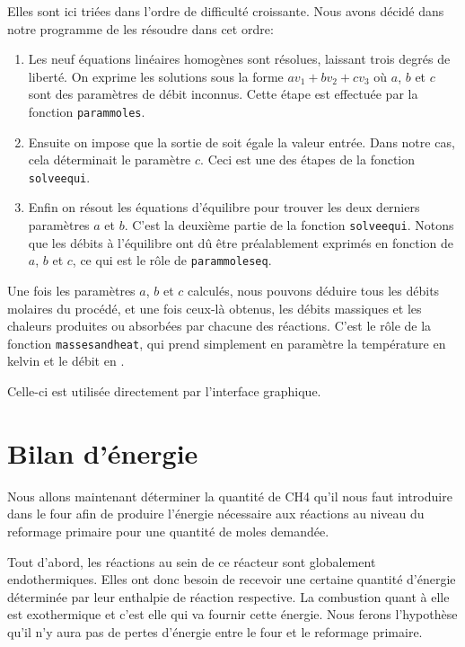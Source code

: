 \documentclass[a4paper,12pt]{article}
\begin{document}
Elles sont ici triées dans l'ordre de difficulté croissante.
Nous avons décidé dans notre programme de les résoudre dans cet ordre:
\begin{enumerate}
    \item Les neuf équations linéaires homogènes sont résolues,
        laissant trois degrés de liberté.
        On exprime les solutions sous la forme $av_1 + bv_2 + cv_3$
        où $a$, $b$ et $c$ sont des paramètres de débit inconnus.
        Cette étape est effectuée par la fonction \texttt{param\textunderscore moles}.
    \item Ensuite on impose que la sortie de  soit égale la valeur entrée.
        Dans notre cas, cela déterminait le paramètre $c$.
        Ceci est une des étapes de la fonction \texttt{solve\textunderscore equi}.
    \item Enfin on résout les équations d'équilibre pour trouver les deux derniers
        paramètres $a$ et $b$. C'est la deuxième partie de la fonction \texttt{solve\textunderscore equi}.
        Notons que les débits à l'équilibre ont dû être préalablement exprimés en fonction
        de $a$, $b$ et $c$, ce qui est le rôle de \texttt{param\textunderscore moles\textunderscore eq}.
\end{enumerate}

Une fois les paramètres $a$, $b$ et $c$ calculés, nous pouvons déduire tous les débits
molaires du procédé, et une fois ceux-là obtenus,
les débits massiques et les chaleurs produites ou absorbées par chacune des réactions.
C'est le rôle de la fonction \texttt{masses\textunderscore and\textunderscore heat},
qui prend simplement en paramètre la température en kelvin et le débit en \kilogram\per\second.

Celle-ci est utilisée directement par l'interface graphique.

\section{Bilan d'énergie}

Nous allons maintenant déterminer la quantité de CH4 qu’il nous faut introduire
dans le four afin de produire l’énergie nécessaire aux réactions
au niveau du reformage primaire pour une quantité de moles demandée.  

Tout d’abord, les réactions au sein de ce réacteur sont globalement endothermiques.
Elles ont donc besoin de recevoir une certaine quantité d’énergie
déterminée par leur enthalpie de réaction respective.
La combustion quant à elle est exothermique et c’est elle qui va fournir cette énergie.
Nous ferons l’hypothèse qu’il n’y aura pas de pertes d’énergie
entre le four et le reformage primaire.
\end{document}
